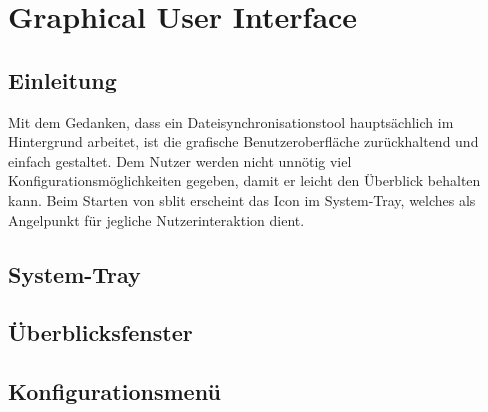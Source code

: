 \chapter{Graphical User Interface}\label{GUI}
\renewcommand{\kapitelautor}{Autor: Andreas Novak}

\section{Einleitung}
Mit dem Gedanken, dass ein Dateisynchronisationstool hauptsächlich im
Hintergrund arbeitet, ist die grafische Benutzeroberfläche zurückhaltend und
einfach gestaltet. Dem Nutzer werden nicht unnötig viel
Konfigurationsmöglichkeiten gegeben, damit er leicht den Überblick behalten
kann. Beim Starten von sblit erscheint das Icon im System-Tray, welches als
Angelpunkt für jegliche Nutzerinteraktion dient.

\section{System-Tray}\label{Systemtray}


\section{Überblicksfenster}\label{Überblicksfenster}


\section{Konfigurationsmenü}\label{Konfigurationsmenü}

